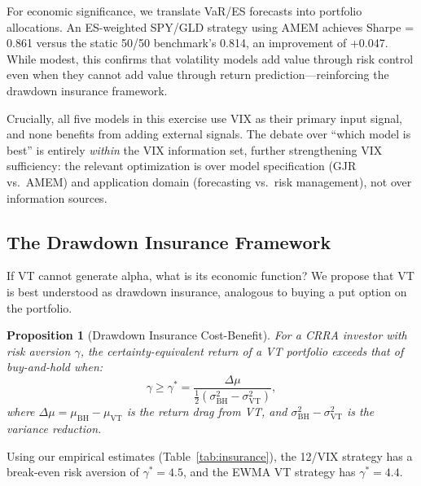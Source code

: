 \documentclass[12pt,a4paper]{article}
\newtheorem{proposition}{Proposition}
\begin{document}
For economic significance, we translate VaR/ES forecasts into portfolio allocations. An ES-weighted SPY/GLD strategy using AMEM achieves Sharpe = 0.861 versus the static 50/50 benchmark's 0.814, an improvement of +0.047. While modest, this confirms that volatility models add value through risk control even when they cannot add value through return prediction---reinforcing the drawdown insurance framework.

Crucially, all five models in this exercise use VIX as their primary input signal, and none benefits from adding external signals. The debate over ``which model is best'' is entirely \emph{within} the VIX information set, further strengthening VIX sufficiency: the relevant optimization is over model specification (GJR vs.\ AMEM) and application domain (forecasting vs.\ risk management), not over information sources.

\subsection{The Drawdown Insurance Framework}

If VT cannot generate alpha, what is its economic function? We propose that VT is best understood as drawdown insurance, analogous to buying a put option on the portfolio.

\begin{proposition}[Drawdown Insurance Cost-Benefit]
\label{prop:insurance}
For a CRRA investor with risk aversion $\gamma$, the certainty-equivalent return of a VT portfolio exceeds that of buy-and-hold when:
\begin{equation}
\gamma \geq \gamma^* = \frac{\Delta \mu}{\frac{1}{2}(\sigma_{\text{BH}}^2 - \sigma_{\text{VT}}^2)},
\label{eq:gamma_star}
\end{equation}
where $\Delta \mu = \mu_{\text{BH}} - \mu_{\text{VT}}$ is the return drag from VT, and $\sigma_{\text{BH}}^2 - \sigma_{\text{VT}}^2$ is the variance reduction.
\end{proposition}

Using our empirical estimates (Table~\ref{tab:insurance}), the 12/VIX strategy has a break-even risk aversion of $\gamma^* = 4.5$, and the EWMA VT strategy has $\gamma^* = 4.4$.
\end{document}
